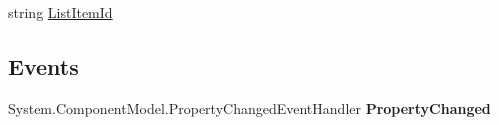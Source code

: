 \begin{DoxyCompactItemize}
\begin{DoxyCompactList}\small\item\em \end{DoxyCompactList}\item 
\hypertarget{class_price___comparison_1_1amazon_1_1ecs_1_1_cart_add_request_item_acab5a748087f104656d3e044e7e78b09}{string \hyperlink{class_price___comparison_1_1amazon_1_1ecs_1_1_cart_add_request_item_acab5a748087f104656d3e044e7e78b09}{List\-Item\-Id}}\label{class_price___comparison_1_1amazon_1_1ecs_1_1_cart_add_request_item_acab5a748087f104656d3e044e7e78b09}

\begin{DoxyCompactList}\small\item\em \end{DoxyCompactList}\end{DoxyCompactItemize}
\subsection*{Events}
\begin{DoxyCompactItemize}
\item 
\hypertarget{class_price___comparison_1_1amazon_1_1ecs_1_1_cart_add_request_item_a1ef98753933667395285f45ae4debd9a}{System.\-Component\-Model.\-Property\-Changed\-Event\-Handler {\bfseries Property\-Changed}}\label{class_price___comparison_1_1amazon_1_1ecs_1_1_cart_add_request_item_a1ef98753933667395285f45ae4debd9a}

\end{DoxyCompactItemize}
